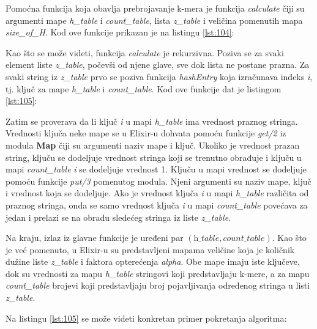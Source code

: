 \documentclass[12pt,oneside]{memoir}
\begin{document}
Pomoćna funkcija koja obavlja prebrojavanje k-mera je funkcija \textit{calculate} čiji su argumenti mape \textit{h\_table} i \textit{count\_table}, lista \textit{z\_table} i veličina pomenutih mapa \textit{size\_of\_H}. Kod ove funkcije prikazan je na listingu \ref{lst:104}: 

\newpage



Kao što se može videti, funkcija \textit{calculate} je rekurzivna. Poziva se za svaki element liste \textit{z\_table}, počevši od njene glave, sve dok lista ne postane prazna. Za svaki string iz \textit{z\_table} prvo se poziva funkcija \textit{hashEntry} koja izračunava indeks \textit{i}, tj. ključ za mape \textit{h\_table} i \textit{count\_table}. Kod ove funkcije dat je listingom \ref{lst:105}:



Zatim se proverava da li ključ \textit{i} u mapi \textit{h\_table} ima vrednost praznog stringa. Vrednosti ključa neke mape se u Elixir-u dohvata pomoću funkcije \textit{get/2} iz modula \textbf{Map} čiji su argumenti naziv mape i ključ. Ukoliko je vrednost prazan string, ključu se dodeljuje vrednost stringa koji se trenutno obrađuje i ključu u mapi \textit{count\_table} \textit{i} se dodeljuje vrednost 1. Ključu u mapi vrednost se dodeljuje pomoću funkcije \textit{put/3} pomenutog modula. Njeni argumenti su naziv mape, ključ i vrednost koja se dodeljuje. Ako je vrednost ključa \textit{i} u mapi \textit{h\_table} različita od praznog stringa, onda se samo vrednost ključa \textit{i} u mapi \textit{count\_table}  povećava za jedan i prelazi se na obradu sledećeg stringa iz liste \textit{z\_table}. 

Na kraju, izlaz iz glavne funkcije je uređeni par $(\textit{h\_table}, \textit{count\_table})$. Kao što je već pomenuto, u Elixir-u su predstavljeni mapama veličine koja je količnik dužine liste \textit{z\_table} i faktora opterećenja \textit{alpha}. Obe mape imaju iste ključeve, dok su vrednosti za mapu \textit{h\_table} stringovi koji predstavljaju k-mere, a za mapu \textit{count\_table} brojevi koji predstavljaju broj pojavljivanja određenog stringa u listi \textit{z\_table}.

Na listingu \ref{lst:105} se može videti konkretan primer pokretanja algoritma:
\end{document}

